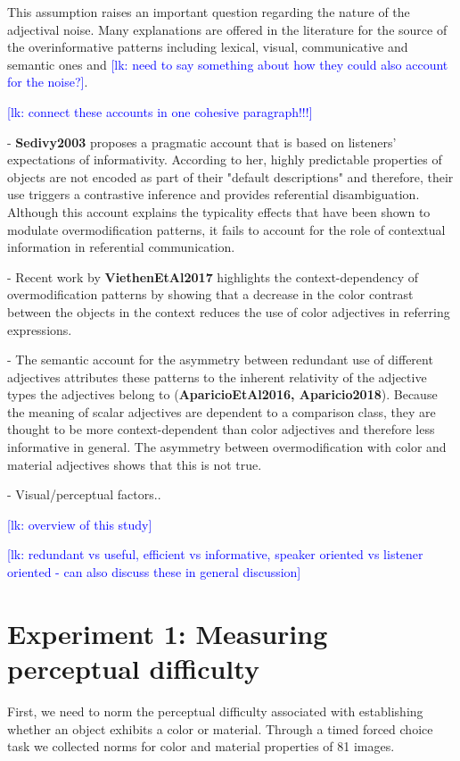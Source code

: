 \documentclass[12pt,letterpaper]{article}
\newcommand{\lk}[1]{\textcolor{Blue}{[lk: #1]}}
\newcommand{\citeA}{\textbf}
\begin{document}
This assumption raises an important question regarding the nature of the adjectival noise. Many explanations are offered in the literature for the source of the overinformative patterns including lexical, visual, communicative and semantic ones and \lk{need to say something about how they could also account for the noise?}. 

\lk{connect these accounts in one cohesive paragraph!!!}

- \citeA{Sedivy2003} proposes a pragmatic account that is based on listeners' expectations of informativity. According to her, highly predictable properties of objects are not encoded as part of their "default descriptions" and therefore, their use triggers a contrastive inference and provides referential disambiguation. Although this account explains the typicality effects that have been shown to modulate overmodification patterns, it fails to account for the role of contextual information in referential communication.

- Recent work by \citeA{ViethenEtAl2017} highlights the context-dependency of overmodification patterns by showing that a decrease in the color contrast between the objects in the context reduces the use of color adjectives in referring expressions.

- The semantic account for the asymmetry between redundant use of different adjectives attributes these patterns to the inherent relativity of the adjective types the adjectives belong to (\citeA{AparicioEtAl2016, Aparicio2018}). Because the meaning of scalar adjectives are dependent to a comparison class, they are thought to be more context-dependent than color adjectives and therefore less informative in general. The asymmetry between overmodification with color and material adjectives shows that this is not true. 

- Visual/perceptual factors..

\lk{overview of this study}

\lk{redundant vs useful, efficient vs informative, speaker oriented vs listener oriented - can also discuss these in general discussion}

\section{Experiment 1: Measuring perceptual difficulty} 

First, we need to norm the perceptual difficulty associated with establishing whether an object exhibits a color or material. Through a timed forced choice task we collected norms for color and material properties of 81 images.
\end{document}
